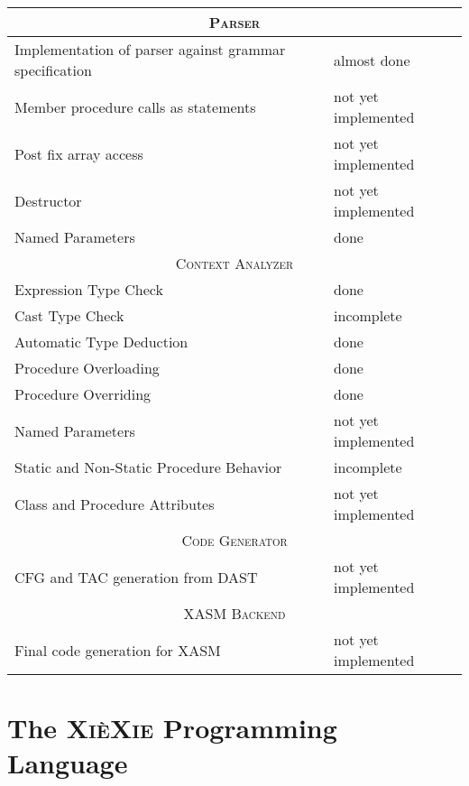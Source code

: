 \documentclass{report}
\def\xiexie{\textsc{Xi\`eXie}\xspace}
\def\done{\textcolor{weakGreen}{done}}
\def\almdone{\textcolor{weakYellow}{almost done}}
\def\incompl{\textcolor{weakOrange}{incomplete}}
\def\notimpl{\textcolor{weakRed}{not yet implemented}}
\begin{document}
\begin{center}
\begin{tabular}[ht]{ | p{} | p{} | }
	\hline
	\multicolumn{2}{|c|}{\textsc{Parser}} \\
	\hline
	Implementation of parser against grammar specification & \almdone \\
	\hline
	Member procedure calls as statements & \notimpl \\
	\hline
	Post fix array access & \notimpl \\
	\hline
	Destructor & \notimpl \\
	\hline
	Named Parameters & \done \\
	
	\hline \hline
	\multicolumn{2}{|c|}{\textsc{Context Analyzer}} \\
	\hline
	Expression Type Check & \done \\
	\hline
	Cast Type Check & \incompl \\
	\hline
	Automatic Type Deduction & \done \\
	\hline
	Procedure Overloading & \done \\
	\hline
	Procedure Overriding & \done \\
	\hline
	Named Parameters & \notimpl \\
	\hline
	Static and Non-Static Procedure Behavior & \incompl \\
	\hline
	Class and Procedure Attributes & \notimpl \\
	
	\hline \hline
	\multicolumn{2}{|c|}{\textsc{Code Generator}} \\
	\hline
	CFG and TAC generation from DAST & \notimpl \\
	
	\hline \hline
	\multicolumn{2}{|c|}{\textsc{XASM Backend}} \\
	\hline
	Final code generation for XASM & \notimpl \\
	\hline
\end{tabular}
\end{center}


\tableofcontents



\part{The \xiexie Programming Language}
\end{document}
